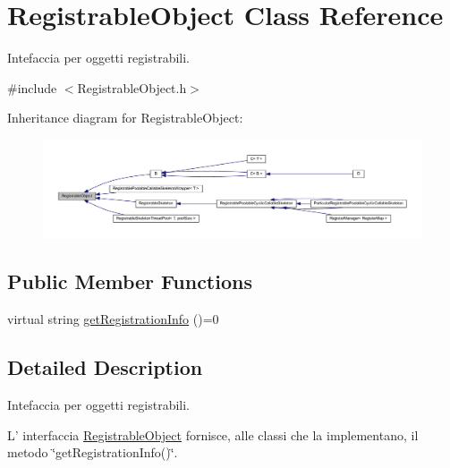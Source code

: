 \hypertarget{class_registrable_object}{
\section{RegistrableObject Class Reference}
\label{class_registrable_object}
}


Intefaccia per oggetti registrabili.  




{\ttfamily \#include $<$RegistrableObject.h$>$}



Inheritance diagram for RegistrableObject:\nopagebreak
\begin{figure}[H]
\begin{center}
\leavevmode
\includegraphics[width=400pt]{class_registrable_object__inherit__graph}
\end{center}
\end{figure}
\subsection*{Public Member Functions}
\begin{DoxyCompactItemize}
\item 
virtual string \hyperlink{class_registrable_object_a169173e1eebfea365e310137e98f1b83}{getRegistrationInfo} ()=0
\end{DoxyCompactItemize}


\subsection{Detailed Description}
Intefaccia per oggetti registrabili. 

L' interfaccia \hyperlink{class_registrable_object}{RegistrableObject} fornisce, alle classi che la implementano, il metodo \char`\"{}getRegistrationInfo()\char`\"{}. 

